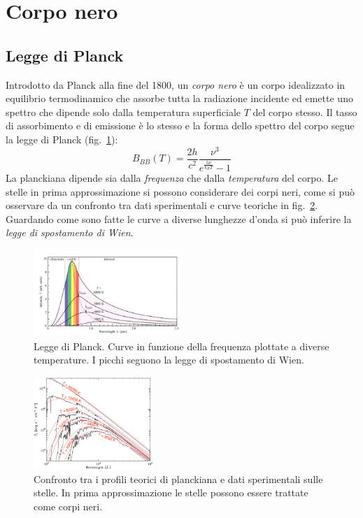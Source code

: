 \section{Corpo nero}\label{sec:corpo-nero}

\subsection{Legge di Planck}\label{sec:legge-planck}
Introdotto da Planck alla fine del 1800, un \emph{corpo nero} è un corpo idealizzato in equilibrio termodinamico che assorbe tutta la radiazione incidente ed emette uno spettro che dipende solo dalla temperatura superficiale $T$ del corpo stesso. Il tasso di assorbimento e di emissione è lo stesso e la forma dello spettro del corpo segue la legge di Planck (fig.~\ref{fig:corpo-nero}):
\begin{equation}\label{eq:corpo-nero}
    B_{BB} (T) = \frac{2 h}{c^2} \frac{\nu^3}{e^{\frac{h \nu}{k_B T}} - 1}
\end{equation}
La planckiana dipende sia dalla \emph{frequenza} che dalla \emph{temperatura} del corpo. Le stelle in prima approssimazione si possono considerare dei corpi neri, come si può osservare da un confronto tra dati sperimentali e curve teoriche in fig.~\ref{fig:stelle-corpi-neri}. Guardando come sono fatte le curve a diverse lunghezze d'onda si può inferire la \emph{legge di spostamento di Wien}.

\begin{figure}
\centering
\includegraphics[width=0.5\textwidth]{immagini/corpo-nero.png}
\caption{Legge di Planck. Curve in funzione della frequenza plottate a diverse temperature. I picchi seguono la legge di spostamento di Wien.}
\label{fig:corpo-nero}
\end{figure}

\begin{figure}
\centering
\includegraphics[width=0.4\textwidth]{immagini/stelle-corpi-neri.png}
\caption{Confronto tra i profili teorici di planckiana e dati sperimentali sulle stelle. In prima approssimazione le stelle possono essere trattate come corpi neri.}
\label{fig:stelle-corpi-neri}
\end{figure}

